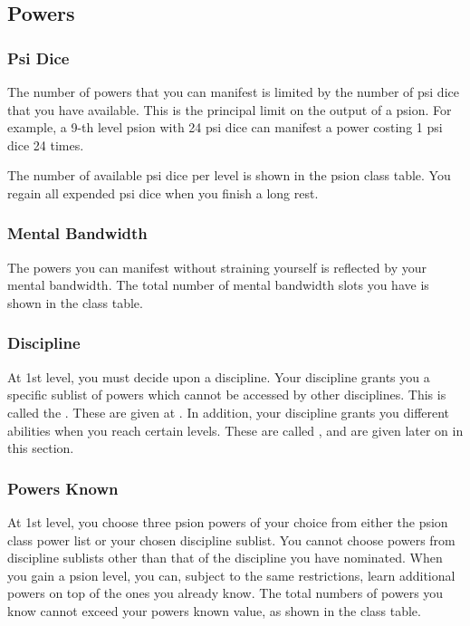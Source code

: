 \subsection{Powers}
\subsubsection{Psi Dice}
The number of powers that you can manifest
is limited by the number of psi dice that
you have available.
This is the principal limit on the output of a psion.
For example, a 9-th level psion with 24 psi dice
can manifest a power costing 1 psi dice 24 times.

The number of available psi dice per level
is shown in the psion class table.
You regain all expended psi dice when you finish
a long rest.

\subsubsection{Mental Bandwidth}
The powers you can manifest without straining yourself
is reflected by your mental bandwidth.
The total number of mental bandwidth slots you have
is shown in the class table.

\subsubsection{Discipline}
\label{subs:psion_discipline}
At 1st level,
you must decide upon a discipline.
Your discipline grants you a specific sublist of powers
which cannot be accessed by other disciplines.
This is called the .
These are given at .
In addition, your discipline grants you different abilities
when you reach certain levels.
These are called ,
and are given later on in this section.

\subsubsection{Powers Known}
At 1st level,
you choose three psion powers of your choice
from either the psion class power list
or your chosen discipline sublist.
You cannot choose powers from discipline sublists
other than that of the discipline you have nominated.
When you gain a psion level,
you can, subject to the same restrictions,
learn additional powers on top of the ones you already know.
The total numbers of powers you know cannot
exceed your powers known value,
as shown in the class table.


